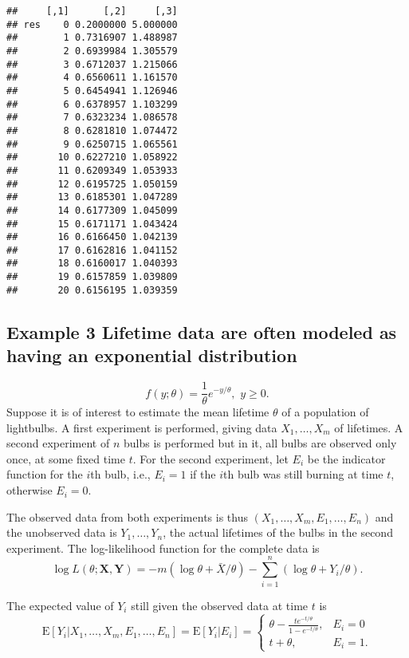 \documentclass[]{article}
\begin{document}
\begin{verbatim}
##     [,1]      [,2]     [,3]
## res    0 0.2000000 5.000000
##        1 0.7316907 1.488987
##        2 0.6939984 1.305579
##        3 0.6712037 1.215066
##        4 0.6560611 1.161570
##        5 0.6454941 1.126946
##        6 0.6378957 1.103299
##        7 0.6323234 1.086578
##        8 0.6281810 1.074472
##        9 0.6250715 1.065561
##       10 0.6227210 1.058922
##       11 0.6209349 1.053933
##       12 0.6195725 1.050159
##       13 0.6185301 1.047289
##       14 0.6177309 1.045099
##       15 0.6171171 1.043424
##       16 0.6166450 1.042139
##       17 0.6162816 1.041152
##       18 0.6160017 1.040393
##       19 0.6157859 1.039809
##       20 0.6156195 1.039359
\end{verbatim}

\hypertarget{example-3-lifetime-data-are-often-modeled-as-having-an-exponential-distribution}{%
\subsection{Example 3 Lifetime data are often modeled as having an
exponential
distribution}\label{example-3-lifetime-data-are-often-modeled-as-having-an-exponential-distribution}}

\[f(y;\theta) = \frac{1}{\theta} e^{-y/\theta}, \,\, y \ge 0.\] Suppose
it is of interest to estimate the mean lifetime \(\theta\) of a
population of lightbulbs. A first experiment is performed, giving data
\(X_1, \ldots, X_m\) of lifetimes. A second experiment of \(n\) bulbs is
performed but in it, all bulbs are observed only once, at some fixed
time \(t\). For the second experiment, let \(E_i\) be the indicator
function for the \(i\)th bulb, i.e., \(E_i=1\) if the \(i\)th bulb was
still burning at time \(t\), otherwise \(E_i=0\).

The observed data from both experiments is thus
\((X_1, \ldots, X_m, E_1, \ldots, E_n)\) and the unobserved data is
\(Y_1, \ldots, Y_n\), the actual lifetimes of the bulbs in the second
experiment. The log-likelihood function for the complete data is
\begin{equation}\label{loglik}
\log L(\theta; \mathbf{X}, \mathbf{Y}) = -m\left(\log \theta + \bar{X}/\theta\right) - \sum_{i=1}^n \left( \log \theta +
Y_i/ \theta\right).
\end{equation}

The expected value of \(Y_i\) still given the observed data at time
\(t\) is \begin{equation}\label{EYi}
\textrm{E}[Y_i | X_1, \ldots, X_m, E_1, \ldots, E_n] = \textrm{E}[Y_i|E_i] = \left\{
\begin{array}{ll}
\theta - \frac{te^{-t/\theta}}{1-e^{-t/\theta}}, & E_i=0 \\
t+\theta, & E_i=1.
\end{array} \right.
\end{equation}
\end{document}
